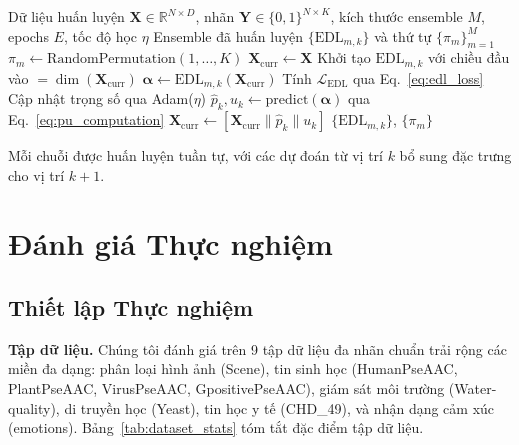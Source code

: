 \documentclass[conference]{IEEEtran}
\begin{document}
\begin{algorithm}[t]
\caption{Quy trình Huấn luyện EDL-ECC}
\label{alg:edl_ecc_training}
\small
\begin{algorithmic}[1]
\Require Dữ liệu huấn luyện $\mathbf{X} \in \mathbb{R}^{N \times D}$, nhãn $\mathbf{Y} \in \{0,1\}^{N \times K}$, kích thước ensemble $M$, epochs $E$, tốc độ học $\eta$
\Ensure Ensemble đã huấn luyện $\{\text{EDL}_{m,k}\}$ và thứ tự $\{\pi_m\}_{m=1}^M$
    \State $\pi_m \leftarrow \text{RandomPermutation}(1, \ldots, K)$
    \State $\mathbf{X}_{\text{curr}} \leftarrow \mathbf{X}$
        \State Khởi tạo $\text{EDL}_{m,k}$ với chiều đầu vào $= \dim(\mathbf{X}_{\text{curr}})$
            \State $\boldsymbol{\alpha} \leftarrow \text{EDL}_{m,k}(\mathbf{X}_{\text{curr}})$
            \State Tính $\mathcal{L}_{\text{EDL}}$ qua Eq.~\eqref{eq:edl_loss}
            \State Cập nhật trọng số qua Adam($\eta$)
        \EndFor
        \State $\hat{p}_k, u_k \leftarrow \text{predict}(\boldsymbol{\alpha})$ qua Eq.~\eqref{eq:pu_computation}
        \State $\mathbf{X}_{\text{curr}} \leftarrow [\mathbf{X}_{\text{curr}} \| \hat{p}_k \| u_k]$
    \EndFor
\EndFor
\State \Return $\{\text{EDL}_{m,k}\}$, $\{\pi_m\}$
\end{algorithmic}
\end{algorithm}

Mỗi chuỗi được huấn luyện tuần tự, với các dự đoán từ vị trí $k$ bổ sung đặc trưng cho vị trí $k+1$.

\section{Đánh giá Thực nghiệm}

\subsection{Thiết lập Thực nghiệm}

\textbf{Tập dữ liệu.} Chúng tôi đánh giá trên 9 tập dữ liệu đa nhãn chuẩn trải rộng các miền đa dạng: phân loại hình ảnh (Scene), tin sinh học (HumanPseAAC, PlantPseAAC, VirusPseAAC, GpositivePseAAC), giám sát môi trường (Water-quality), di truyền học (Yeast), tin học y tế (CHD\_49), và nhận dạng cảm xúc (emotions). Bảng~\ref{tab:dataset_stats} tóm tắt đặc điểm tập dữ liệu.
\end{document}
